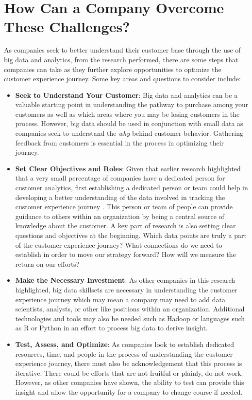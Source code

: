 \documentclass[sigconf]{acmart}
\begin{document}
\section{How Can a Company Overcome These Challenges?}
As companies seek to better understand their customer base through the use of big data and analytics, from the research performed, there are some steps that companies can take as they further explore opportunities to optimize the customer experience journey. Some key areas and questions to consider include:
\begin{itemize}
 \item \textbf{Seek to Understand Your Customer}: Big data and analytics can be a valuable starting point in understanding the pathway to purchase among your customers as well as which areas where you may be losing customers in the process. However, big data should be used in conjunction with small data as companies seek to understand the \textit{why} behind customer behavior. Gathering feedback from customers is essential in the process in optimizing their journey. 
 \item \textbf{Set Clear Objectives and Roles}: Given that earlier research highlighted that a very small percentage of companies have a dedicated person for customer analytics, first establishing a dedicated person or team could help in developing a better understanding of the data involved in tracking the customer experience journey \cite{Nichols2013}. This person or team of people can provide guidance to others within an organization by being a central source of knowledge about the customer. A key part of research is also setting clear questions and objectives at the beginning. Which data points are truly a part of the customer experience journey? What connections do we need to establish in order to move our strategy forward? How will we measure the return on our efforts?  
 \item \textbf{Make the Necessary Investment}: As other companies in this research highlighted, big data skillsets are necessary in understanding the customer experience journey which may mean a company may need to add data scientists, analysts, or other like positions within an organization. Additional technologies and tools may also be needed such as Hadoop or languages such as R or Python in an effort to process big data to derive insight. 
 \item \textbf{Test, Assess, and Optimize}: As companies look to establish dedicated resources, time, and people in the process of understanding the customer experience journey, there must also be acknowledgement that this process is iterative. There could be efforts that are not fruitful or plainly, do not work. However, as other companies have shown, the ability to test can provide this insight and allow the opportunity for a company to change course if needed.
\end{itemize}
\end{document}
